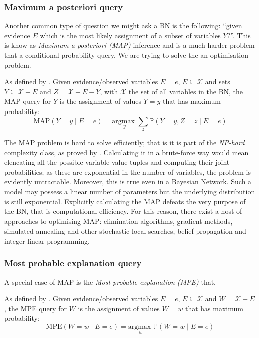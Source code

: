 \subsubsection{Maximum a posteriori query}
Another common type of question we might ask a BN is the following: ``given evidence $E$ which is the most likely assignment of a subset of variables $Y$?''.
This is know as \textit{Maximum a posteriori (MAP)} inference and is a much harder problem that a conditional probability query.
We are trying to solve the an optimisation problem.
\begin{definition}
As defined by \cite{koller2007introduction}.
Given evidence/observed variables $E=e$, $E \subseteq \mathcal{X}$ and sets $Y \subseteq \mathcal{X} - E$ and $Z = \mathcal{X} - E - Y$, with $\mathcal{X}$ the set of all variables in the BN, the MAP query for $Y$ is the assignment of values $Y=y$ that has maximum probability:
	\begin{equation} \label{eq:map}
	\text{MAP}( Y=y \mid E=e ) = \underset{y}{\text{argmax }}  \sum_z \mathbb{P}(Y=y, Z=z \mid E=e)
\end{equation}
\end{definition}


The MAP problem is hard to solve efficiently; that is it is part of the \textit{NP-hard} complexity class, as proved by \cite{Shimony1994}.
Calculating it in a brute-force way would mean elencating all the possible variable-value tuples and computing their joint probabilities; as these are exponential in the number of variables, the problem is evidently untractable.
Moreover, this is true even in a Bayesian Network.  
Such a model may possess a linear number of parameters but the underlying distribution is still exponential.
Explicitly calculating the MAP defeats the very purpose of the BN, that is computational efficiency.
For this reason, there exist a host of approaches to optimising MAP: elimination algorithms, gradient methods, simulated annealing and other stochastic local searches, belief propagation and integer linear programming.


\subsubsection{Most probable explanation query}
A special case of MAP is the \textit{Most probable explanation (MPE)} that, 
\begin{definition}
	As defined by \cite{koller2007introduction}.
 Given evidence/observed variables $E=e$, $E \subseteq \mathcal{X}$ and $W = \mathcal{X} - E$, the MPE query for $W$ is the assignment of values $W=w$ that has maximum probability:
	\begin{equation} \label{eq:mpe}
	\text{MPE}( W=w \mid E=e ) = \underset{w}{\text{argmax }} \mathbb{P}(W=w \mid E=e)
\end{equation}
\end{definition}

